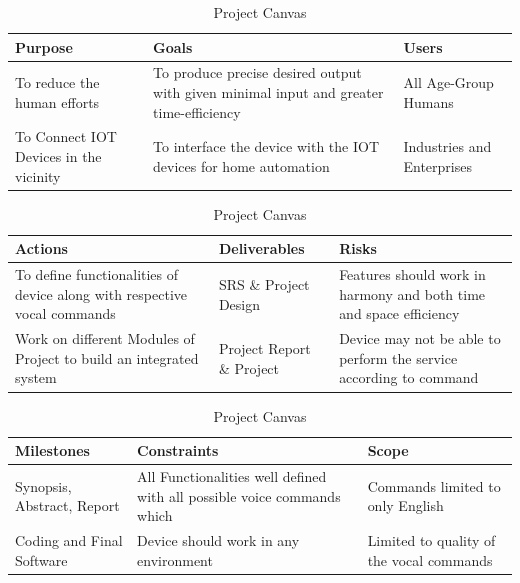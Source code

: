 \begin{table}[ht]
\caption{Project Canvas}
\begin{tabular}{ |p{5cm}|p{5cm}|p{5cm}|  }
 \hline
 \textbf{Purpose} & \textbf{Goals} & \textbf{Users}\\
 \hline
To reduce the human efforts & To produce precise desired output with given minimal input and greater time-efficiency & All Age-Group Humans\\

To Connect IOT Devices in the vicinity & To interface the device with the IOT devices for home automation & Industries and Enterprises \\
 
 \hline
 \end{tabular}
 
\vspace{0.5cm} 
 
\begin{tabular}{ |p{5cm}|p{5cm}|p{5cm}|  }
 \hline
 \textbf{Actions} & \textbf{Deliverables} & \textbf{Risks} \\
 \hline
 To define functionalities of device along with respective vocal commands  & SRS \& Project Design & Features should work in harmony and both time and space efficiency\\


  Work on different Modules of Project to build an integrated system & Project Report \& Project & Device may not be able to perform the service according to command\\
   \hline
 
 \end{tabular}
 
\vspace{0.5cm} 

 \begin{tabular}{ |p{5cm}|p{5cm}|p{5cm}|  }
 \hline
 \textbf{Milestones} & \textbf{Constraints} & \textbf{Scope} \\
 \hline
 Synopsis, Abstract, Report & All Functionalities well defined with all possible voice commands which & Commands limited to only English\\

  Coding and Final Software  & Device should work in any environment & Limited to quality of the vocal commands\\ 
   \hline
 
 \end{tabular}
  
 
\end{table} 



